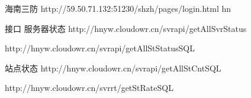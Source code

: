 海南三防
http://59.50.71.132:51230/shzh/pages/login.html   hn

接口
服务器状态
http://hnyw.cloudowr.cn/svrapi/getAllSvrStatus


http://hnyw.cloudowr.cn/svrapi/getAllStStatusSQL

站点状态
http://hnyw.cloudowr.cn/svrapi/getAllStCntSQL


http://hnyw.cloudowr.cn/svrrt/getStRateSQL